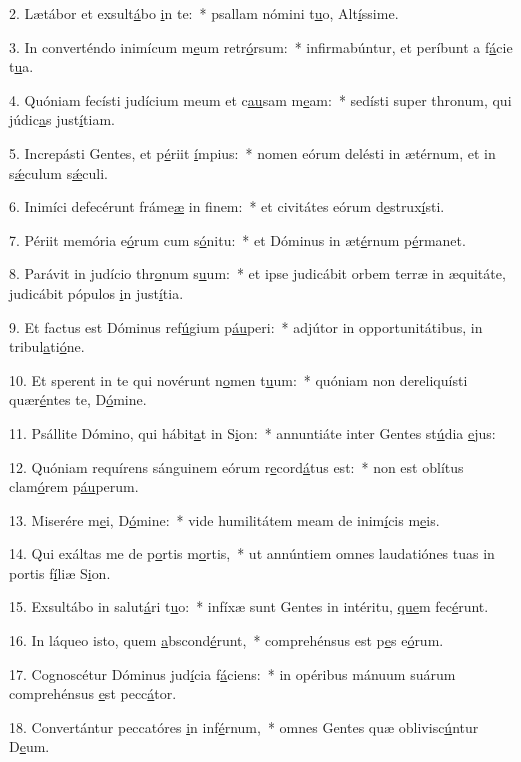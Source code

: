 2. Lætábor et exsult\uline{á}bo \uline{i}n te:~* psallam nómini t\uline{u}o, Alt\uline{í}ssime.\par 
3. In converténdo inimícum m\uline{e}um retr\uline{ó}rsum:~* infirmabúntur, et períbunt a f\uline{á}cie t\uline{u}a.\par 
4. Quóniam fecísti judícium meum et c\uline{au}sam m\uline{e}am:~* sedísti super thronum, qui júdic\uline{a}s just\uline{í}tiam.\par 
5. Increpásti Gentes, et p\uline{é}riit \uline{í}mpius:~* nomen eórum delésti in ætérnum, et in s\uline{ǽ}culum s\uline{ǽ}culi.\par 
6. Inimíci defecérunt fráme\uline{æ} in f\uline{i}nem:~* et civitátes eórum d\uline{e}strux\uline{í}sti.\par 
7. Périit memória e\uline{ó}rum cum s\uline{ó}nitu:~* et Dóminus in æt\uline{é}rnum p\uline{é}rmanet.\par 
8. Parávit in judício thr\uline{o}num s\uline{u}um:~* et ipse judicábit orbem terræ in æquitáte, judicábit pópulos \uline{i}n just\uline{í}tia.\par 
9. Et factus est Dóminus ref\uline{ú}gium p\uline{áu}peri:~* adjútor in opportunitátibus, in tribul\uline{a}ti\uline{ó}ne.\par 
10. Et sperent in te qui novérunt n\uline{o}men t\uline{u}um:~* quóniam non dereliquísti quær\uline{é}ntes te, D\uline{ó}mine.\par 
11. Psállite Dómino, qui hábit\uline{a}t in S\uline{i}on:~* annuntiáte inter Gentes st\uline{ú}dia \uline{e}jus:\par 
12. Quóniam requírens sánguinem eórum r\uline{e}cord\uline{á}tus est:~* non est oblítus clam\uline{ó}rem p\uline{áu}perum.\par 
13. Miserére m\uline{e}i, D\uline{ó}mine:~* vide humilitátem meam de inim\uline{í}cis m\uline{e}is.\par 
14. Qui exáltas me de p\uline{o}rtis m\uline{o}rtis,~* ut annúntiem omnes laudatiónes tuas in portis f\uline{í}liæ S\uline{i}on.\par 
15. Exsultábo in salut\uline{á}ri t\uline{u}o:~* infíxæ sunt Gentes in intéritu, \uline{que}m fec\uline{é}runt.\par 
16. In láqueo isto, quem \uline{a}bscond\uline{é}runt,~* comprehénsus est p\uline{e}s e\uline{ó}rum.\par 
17. Cognoscétur Dóminus jud\uline{í}cia f\uline{á}ciens:~* in opéribus mánuum suárum comprehénsus \uline{e}st pecc\uline{á}tor.\par 
18. Convertántur peccatóres \uline{i}n inf\uline{é}rnum,~* omnes Gentes quæ oblivisc\uline{ú}ntur D\uline{e}um.\par 
